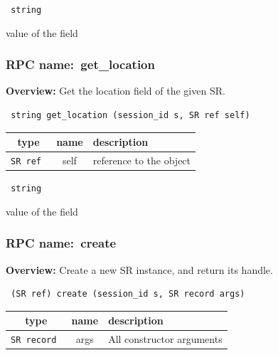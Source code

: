{\tt 
string
}


value of the field
\vspace{0.3cm}
\vspace{0.3cm}
\vspace{0.3cm}
\subsubsection{RPC name:~get\_location}

{\bf Overview:} 
Get the location field of the given SR.

\begin{verbatim} string get_location (session_id s, SR ref self)\end{verbatim}



 
\vspace{0.3cm}
\begin{tabular}{|c|c|p{7cm}|}
 \hline
{\bf type} & {\bf name} & {\bf description} \\ \hline
{\tt SR ref } & self & reference to the object \\ \hline 

\end{tabular}

\vspace{0.3cm}

{\tt 
string
}


value of the field
\vspace{0.3cm}
\vspace{0.3cm}
\vspace{0.3cm}
\subsubsection{RPC name:~create}

{\bf Overview:} 
Create a new SR instance, and return its handle.

\begin{verbatim} (SR ref) create (session_id s, SR record args)\end{verbatim}



 
\vspace{0.3cm}
\begin{tabular}{|c|c|p{7cm}|}
 \hline
{\bf type} & {\bf name} & {\bf description} \\ \hline
{\tt SR record } & args & All constructor arguments \\ \hline 

\end{tabular}

